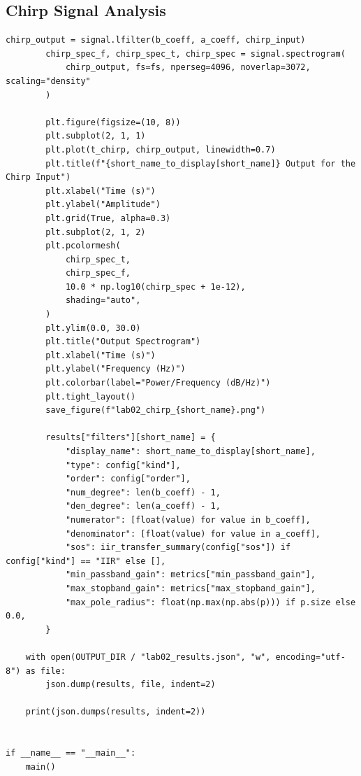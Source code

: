 \documentclass[12pt, a4paper]{article}
\begin{document}
\subsection{Chirp Signal Analysis}
\begin{lstlisting}[caption={Chirp-input analysis, results export, and script termination for Lab 02.}, label={lst:lab02_chirp}]
        chirp_output = signal.lfilter(b_coeff, a_coeff, chirp_input)
        chirp_spec_f, chirp_spec_t, chirp_spec = signal.spectrogram(
            chirp_output, fs=fs, nperseg=4096, noverlap=3072, scaling="density"
        )

        plt.figure(figsize=(10, 8))
        plt.subplot(2, 1, 1)
        plt.plot(t_chirp, chirp_output, linewidth=0.7)
        plt.title(f"{short_name_to_display[short_name]} Output for the Chirp Input")
        plt.xlabel("Time (s)")
        plt.ylabel("Amplitude")
        plt.grid(True, alpha=0.3)
        plt.subplot(2, 1, 2)
        plt.pcolormesh(
            chirp_spec_t,
            chirp_spec_f,
            10.0 * np.log10(chirp_spec + 1e-12),
            shading="auto",
        )
        plt.ylim(0.0, 30.0)
        plt.title("Output Spectrogram")
        plt.xlabel("Time (s)")
        plt.ylabel("Frequency (Hz)")
        plt.colorbar(label="Power/Frequency (dB/Hz)")
        plt.tight_layout()
        save_figure(f"lab02_chirp_{short_name}.png")

        results["filters"][short_name] = {
            "display_name": short_name_to_display[short_name],
            "type": config["kind"],
            "order": config["order"],
            "num_degree": len(b_coeff) - 1,
            "den_degree": len(a_coeff) - 1,
            "numerator": [float(value) for value in b_coeff],
            "denominator": [float(value) for value in a_coeff],
            "sos": iir_transfer_summary(config["sos"]) if config["kind"] == "IIR" else [],
            "min_passband_gain": metrics["min_passband_gain"],
            "max_stopband_gain": metrics["max_stopband_gain"],
            "max_pole_radius": float(np.max(np.abs(p))) if p.size else 0.0,
        }

    with open(OUTPUT_DIR / "lab02_results.json", "w", encoding="utf-8") as file:
        json.dump(results, file, indent=2)

    print(json.dumps(results, indent=2))


if __name__ == "__main__":
    main()
\end{lstlisting}
\end{document}
